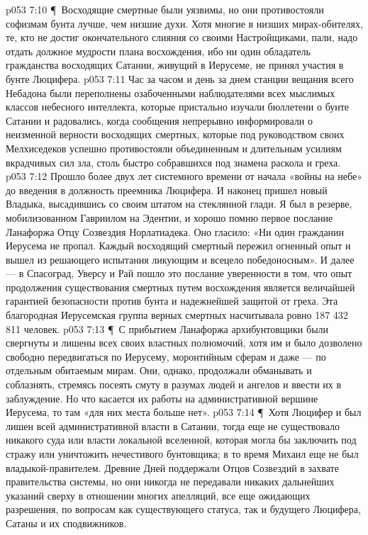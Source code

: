 \vs p053 7:10 \P\ Восходящие смертные были уязвимы, но они противостояли софизмам бунта лучше, чем низшие духи. Хотя многие в низших мирах\hyp{}обителях, те, кто не достиг окончательного слияния со своими Настройщиками, пали, надо отдать должное мудрости плана восхождения, ибо ни один обладатель гражданства восходящих Сатании, живущий в Иерусеме, не принял участия в бунте Люцифера.
\vs p053 7:11 Час за часом и день за днем станции вещания всего Небадона были переполнены озабоченными наблюдателями всех мыслимых классов небесного интеллекта, которые пристально изучали бюллетени о бунте Сатании и радовались, когда сообщения непрерывно информировали о неизменной верности восходящих смертных, которые под руководством своих Мелхиседеков успешно противостояли объединенным и длительным усилиям вкрадчивых сил зла, столь быстро собравшихся под знамена раскола и греха.
\vs p053 7:12 Прошло более двух лет системного времени от начала «войны на небе» до введения в должность преемника Люцифера. И наконец пришел новый Владыка, высадившись со своим штатом на стеклянной глади. Я был в резерве, мобилизованном Гавриилом на Эдентии, и хорошо помню первое послание Ланафоржа Отцу Созвездия Норлатиадека. Оно гласило: «Ни один гражданин Иерусема не пропал. Каждый восходящий смертный пережил огненный опыт и вышел из решающего испытания ликующим и всецело победоносным». И далее --- в Спасоград, Уверсу и Рай пошло это послание уверенности в том, что опыт продолжения существования смертных путем восхождения является величайшей гарантией безопасности против бунта и надежнейшей защитой от греха. Эта благородная Иерусемская группа верных смертных насчитывала ровно 187 432 811 человек.
\vs p053 7:13 \P\ С прибытием Ланафоржа архибунтовщики были свергнуты и лишены всех своих властных полномочий, хотя им и было дозволено свободно передвигаться по Иерусему, моронтийным сферам и даже --- по отдельным обитаемым мирам. Они, однако, продолжали обманывать и соблазнять, стремясь посеять смуту в разумах людей и ангелов и ввести их в заблуждение. Но что касается их работы на административной вершине Иерусема, то там «для них места больше нет».
\vs p053 7:14 \P\ Хотя Люцифер и был лишен всей административной власти в Сатании, тогда еще не существовало никакого суда или власти локальной вселенной, которая могла бы заключить под стражу или уничтожить нечестивого бунтовщика; в то время Михаил еще не был владыкой\hyp{}правителем. Древние Дней поддержали Отцов Созвездий в захвате правительства системы, но они никогда не передавали никаких дальнейших указаний сверху в отношении многих апелляций, все еще ожидающих разрешения, по вопросам как существующего статуса, так и будущего Люцифера, Сатаны и их сподвижников.
